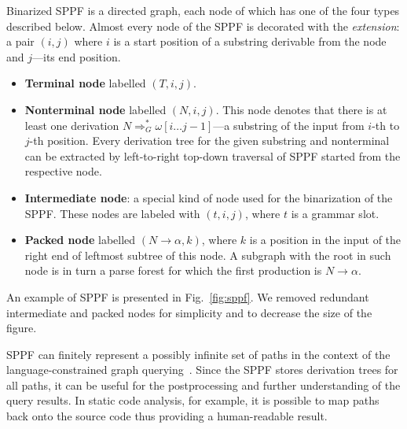 Binarized SPPF is a directed graph, each node of which has one of the four types described below.
Almost every node of the SPPF is decorated with the \emph{extension}: a pair $(i, j)$ where $i$ is a start position of a substring derivable from the node and $j$---its end position.

\begin{itemize}
    \item \textbf{Terminal node} labelled $(T, i, j)$.
    \item \textbf{Nonterminal node} labelled $(N, i, j)$.
    This node denotes that there is at least one derivation $N \Rightarrow^*_G \omega[i \dots j-1]$---a substring of the input from $i$-th to $j$-th position.
    Every derivation tree for the given substring and nonterminal can be extracted by left-to-right top-down traversal of SPPF started from the respective node.
    \item \textbf{Intermediate node}: a special kind of node used for the binarization of the SPPF. These nodes are labeled with $(t,i,j)$, where $t$ is a grammar slot.
    \item \textbf{Packed node} labelled $(N \rightarrow \alpha, k)$, where $k$ is a position in the input of the right end of leftmost subtree of this node.
    A subgraph with the root in such node is in turn a parse forest for which the first production is $N \rightarrow \alpha$.
\end{itemize}


An example of SPPF is presented in Fig.~\ref{fig:sppf}.
We removed redundant intermediate and packed nodes for simplicity and to decrease the size of the figure.

SPPF can finitely represent a possibly infinite set of paths in the context of the language-constrained graph querying~\cite{GrigorevR16}.
Since the SPPF stores derivation trees for all paths, it can be useful for the postprocessing and further understanding of the query results.
In static code analysis, for example, it is possible to map paths back onto the source code thus providing a human-readable result.